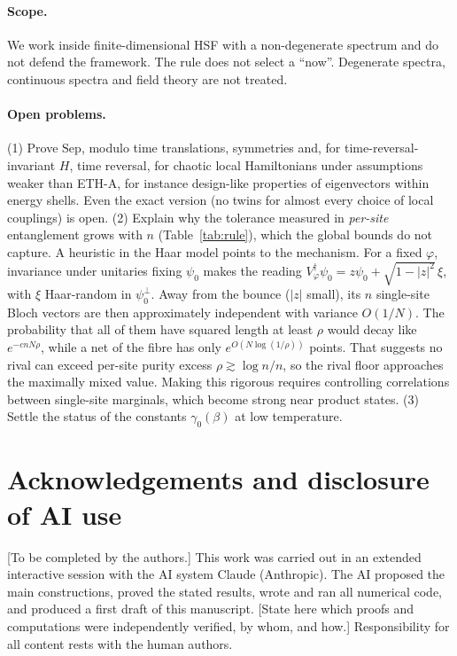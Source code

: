 \documentclass[11pt]{article}
\theoremstyle{definition}
\theoremstyle{remark}
\begin{document}
\paragraph{Scope.} We work inside finite-dimensional HSF with a non-degenerate spectrum and do not defend the framework. The rule does not select a ``now''. Degenerate spectra, continuous spectra and field theory are not treated.

\paragraph{Open problems.} (1) Prove $\mathrm{Sep}$, modulo time translations, symmetries and, for time-reversal-invariant $H$, time reversal, for chaotic local Hamiltonians under assumptions weaker than ETH-A, for instance design-like properties of eigenvectors within energy shells. Even the exact version (no twins for almost every choice of local couplings) is open. (2) Explain why the tolerance measured in \emph{per-site} entanglement grows with $n$ (Table~\ref{tab:rule}), which the global bounds do not capture. A heuristic in the Haar model points to the mechanism. For a fixed $\varphi$, invariance under unitaries fixing $\psi_0$ makes the reading $V_\varphi^\dagger\psi_0=z\psi_0+\sqrt{1-|z|^2}\,\xi$, with $\xi$ Haar-random in $\psi_0^\perp$. Away from the bounce ($|z|$ small), its $n$ single-site Bloch vectors are then approximately independent with variance $O(1/N)$. The probability that all of them have squared length at least $\rho$ would decay like $e^{-cnN\rho}$, while a net of the fibre has only $e^{O(N\log(1/\rho))}$ points. That suggests no rival can exceed per-site purity excess $\rho\gtrsim\log n/n$, so the rival floor approaches the maximally mixed value. Making this rigorous requires controlling correlations between single-site marginals, which become strong near product states. (3) Settle the status of the constants $\gamma_0(\beta)$ at low temperature.

\section*{Acknowledgements and disclosure of AI use}
[To be completed by the authors.] This work was carried out in an extended interactive session with the AI system Claude (Anthropic). The AI proposed the main constructions, proved the stated results, wrote and ran all numerical code, and produced a first draft of this manuscript. [State here which proofs and computations were independently verified, by whom, and how.] Responsibility for all content rests with the human authors.
\end{document}
